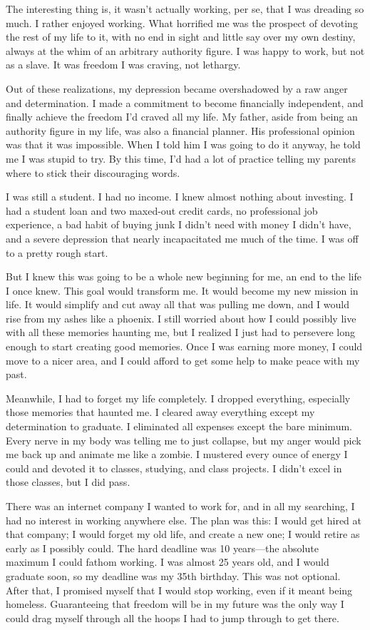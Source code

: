 The interesting thing is, it wasn't actually working, per se, that I was dreading so much. I rather enjoyed working. What horrified me was the prospect of devoting the rest of my life to it, with no end in sight and little say over my own destiny, always at the whim of an arbitrary authority figure. I was happy to work, but not as a slave. It was freedom I was craving, not lethargy.

Out of these realizations, my depression became overshadowed by a raw anger and determination. I made a commitment to become financially independent, and finally achieve the freedom I'd craved all my life. My father, aside from being an authority figure in my life, was also a financial planner. His professional opinion was that it was impossible. When I told him I was going to do it anyway, he told me I was stupid to try. By this time, I'd had a lot of practice telling my parents where to stick their discouraging words.

I was still a student. I had no income. I knew almost nothing about investing. I had a student loan and two maxed-out credit cards, no professional job experience, a bad habit of buying junk I didn't need with money I didn't have, and a severe depression that nearly incapacitated me much of the time. I was off to a pretty rough start.

But I knew this was going to be a whole new beginning for me, an end to the life I once knew. This goal would transform me. It would become my new mission in life. It would simplify and cut away all that was pulling me down, and I would rise from my ashes like a phoenix. I still worried about how I could possibly live with all these memories haunting me, but I realized I just had to persevere long enough to start creating good memories. Once I was earning more money, I could move to a nicer area, and I could afford to get some help to make peace with my past.

Meanwhile, I had to forget my life completely. I dropped everything, especially those memories that haunted me. I cleared away everything except my determination to graduate. I eliminated all expenses except the bare minimum. Every nerve in my body was telling me to just collapse, but my anger would pick me back up and animate me like a zombie. I mustered every ounce of energy I could and devoted it to classes, studying, and class projects. I didn't excel in those classes, but I did pass.

There was an internet company I wanted to work for, and in all my searching, I had no interest in working anywhere else. The plan was this: I would get hired at that company; I would forget my old life, and create a new one; I would retire as early as I possibly could. The hard deadline was 10 years---the absolute maximum I could fathom working. I was almost 25 years old, and I would graduate soon, so my deadline was my 35th birthday. This was not optional. After that, I promised myself that I would stop working, even if it meant being homeless. Guaranteeing that freedom will be in my future was the only way I could drag myself through all the hoops I had to jump through to get there.

